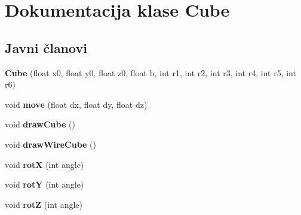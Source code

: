 \hypertarget{classCube}{}\section{Dokumentacija klase Cube}
\label{classCube}
\subsection*{Javni članovi}
\begin{DoxyCompactItemize}
\item 
{\bfseries Cube} (float x0, float y0, float z0, float b, int r1, int r2, int r3, int r4, int r5, int r6)\hypertarget{classCube_a7ce804eeb13de1422675b09daad3faae}{}\label{classCube_a7ce804eeb13de1422675b09daad3faae}

\item 
void {\bfseries move} (float dx, float dy, float dz)\hypertarget{classCube_a7e918996b6a82d1db343a90885a00c15}{}\label{classCube_a7e918996b6a82d1db343a90885a00c15}

\item 
void {\bfseries draw\+Cube} ()\hypertarget{classCube_afb47b6043745500131cb73ebc3679848}{}\label{classCube_afb47b6043745500131cb73ebc3679848}

\item 
void {\bfseries draw\+Wire\+Cube} ()\hypertarget{classCube_a1fbce1be7a282c4816882da3dcaac3c1}{}\label{classCube_a1fbce1be7a282c4816882da3dcaac3c1}

\item 
void {\bfseries rotX} (int angle)\hypertarget{classCube_a9a5f94792c844ae48805dfc5a0375462}{}\label{classCube_a9a5f94792c844ae48805dfc5a0375462}

\item 
void {\bfseries rotY} (int angle)\hypertarget{classCube_abee07db10f7048163310e32dec4afbb2}{}\label{classCube_abee07db10f7048163310e32dec4afbb2}

\item 
void {\bfseries rotZ} (int angle)\hypertarget{classCube_a47a4720233737b5f09e4a756d8f382bc}{}\label{classCube_a47a4720233737b5f09e4a756d8f382bc}

\end{DoxyCompactItemize}
